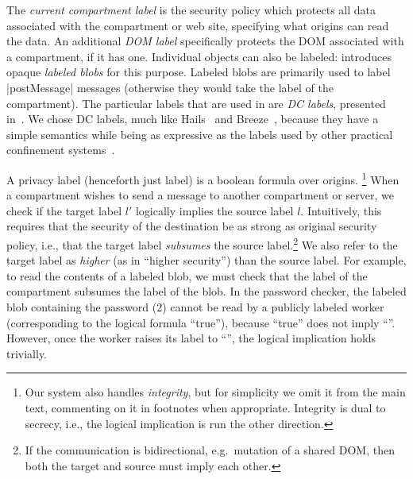 The \emph{current compartment label} is the security policy which protects all data associated with the compartment or
web site, specifying what origins can read the data.
%
An additional \emph{DOM label} specifically protects the DOM associated
with a compartment, if it has one.
%
Individual objects can also be labeled: \sys{}
introduces opaque \emph{labeled blobs} for this purpose.
%
Labeled blobs are primarily used to label \js|postMessage| messages
(otherwise they would take the label of the compartment).
%
The particular labels that are used in \sys{} are \emph{DC labels},
presented in~\cite{stefan:2011:dclabels}.
%
We chose DC labels, much like Hails~\cite{giffin:2012:hails} and
Breeze~\cite{Breeze13}, because they have a simple
semantics while being as expressive as the labels used by other practical
confinement systems~\cite{GenLabels}.
%

A privacy label (henceforth just label) is a boolean formula over
origins.%
%
\footnote{
  Our system also handles \emph{integrity}, but for simplicity we
  omit it from the main text, commenting on it in footnotes when
  appropriate.  Integrity is dual to secrecy, i.e., the logical
  implication is run the other direction.
}
%
When a compartment wishes to send a message to another compartment or
server, we check if the target label $l'$ logically implies the source
label $l$.
%
Intuitively, this requires that the security of the destination be as strong as original security policy, i.e., that the target label \emph{subsumes} the source label.\footnote{If the communication is bidirectional, e.g.\ mutation of a shared DOM, then both the target and source must imply each other.}
%
We also refer to the target label as \emph{higher} (as in ``higher security'') than the source label.
%
For example, to read the contents of a labeled blob, we must check that
the label of the compartment subsumes the label of the blob.
%
In the password checker, the labeled blob containing the password (2)
cannot be read by a publicly labeled worker (corresponding to the
logical formula ``true''), because ``true'' does not imply
``''.
%
However, once the worker raises its label to ``'', the
logical implication holds trivially.

